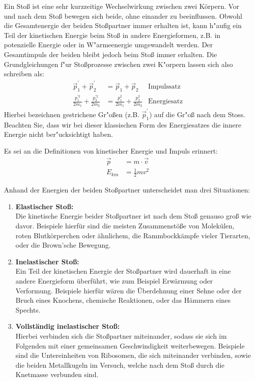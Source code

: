 Ein Stoß ist eine sehr kurzzeitige Wechselwirkung zwischen zwei Körpern. Vor und nach dem Stoß bewegen sich beide, ohne einander zu beeinflussen. Obwohl die Gesamtenergie der beiden Sto{\ss}partner immer erhalten ist, kann h"aufig ein Teil der kinetischen Energie beim Sto{\ss} in andere Energieformen, z.B. in potenzielle Energie oder in W"armeenergie umgewandelt werden. Der Gesamtimpuls der beiden bleibt jedoch beim Sto{\ss} immer erhalten. Die Grundgleichungen f"ur Sto{\ss}prozesse zwischen zwei K"orpern lassen sich also schreiben als:
\begin{align}
\vec{p}_1^{'} + \vec{p}_2^{'} &= \vec{p}_1 + \vec{p}_2 &\mathrm{Impulssatz}\\
\frac{p_1^{'2}}{2m_1} + \frac{p_2^{'2}}{2m_2} &= \frac{p_1^{2}}{2m_1} + \frac{p_2^{2}}{2m_2} &\mathrm{Energiesatz}
\end{align} 
%
Hierbei bezeichnen gestrichene Gr"o{\ss}en (z.B. $\vec{p}_1^{'}$) auf die Gr"o{\ss} nach dem Stoss. Beachten Sie, dass wir bei dieser klassischen Form des Energiesatzes die innere Energie nicht ber"ucksichtigt haben.\\
%
\begin{hint}
	Es sei an die Definitionen von kinetischer Energie und Impuls erinnert:
	\begin{align}
		\vec{p} &= m\cdot\vec{v}\\
		E_{kin} &= \frac{1}{2}mv^2 
	\end{align}
\end{hint}
%
Anhand der Energien der beiden Stoßpartner unterscheidet man drei Situationen:
\begin{enumerate}
	\item \textbf{Elastischer Stoß:}\\
		Die kinetische Energie beider Stoßpartner ist nach dem Stoß genauso groß wie davor. Beispiele hierfür sind die meisten Zusammenstöße von Molekülen, roten Blutkörperchen oder ähnlichem, die Rammbockkämpfe vieler Tierarten, oder die Brown'sche Bewegung.
	\item \textbf{Inelastischer Stoß:}\\
		Ein Teil der kinetischen Energie der Stoßpartner wird dauerhaft in eine andere Energieform überführt, wie zum Beispiel Erwärmung oder Verformung. Beispiele hierfür wären die Überdehnung einer Sehne oder der Bruch eines Knochens, chemische Reaktionen, oder das Hämmern eines Spechts.
	\item \textbf{Vollständig inelastischer Stoß:}\\
		Hierbei verbinden sich die Stoßpartner miteinander, sodass sie sich im Folgenden mit einer gemeinsamen Geschwindigkeit weiterbewegen. Beispiele sind die Untereinheiten von Ribosomen, die sich miteinander verbinden, sowie die beiden Metallkugeln im Versuch, welche nach dem Stoß durch die Knetmasse verbunden sind.
\end{enumerate}
